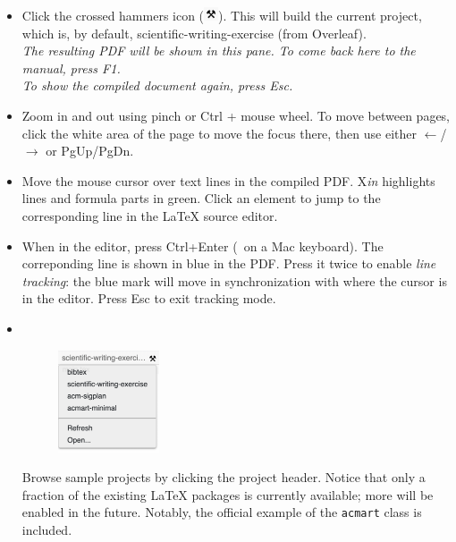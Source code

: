\documentclass{article}
\newcommand\ToXin{\raisebox{0.5pt}{T}\hspace{-.8pt}\raisebox{1pt}{o}\hspace{-1pt}X{\hspace{-1pt}\itshape in}}
\newcommand\keyplus{\raisebox{.7pt}{\fontsize{8}{8}\selectfont+}}
\newcommand\myreturn{\fontsize{9}{9}\selectfont\return}
\begin{document}
\begin{itemize}
\item Click the crossed hammers icon
 (\includegraphics[width=12pt,valign=t]{gfx/button-build.png}).
 This will build the current project,
 which is, by default, \textsf{scientific-writing-exercise} (from Overleaf). \\[.2em]
 \textit{The resulting PDF will be shown in this pane. To come back here to the manual, press {\rm F1}.}\\[.2em]
 \textit{To show the compiled document again, press {\rm Esc}.}

 
\item Zoom in and out using pinch or Ctrl + mouse wheel.
To move between pages, click the white area of the page to move the focus there,
then use either $\leftarrow$/$\rightarrow$
or PgUp/PgDn.
 
\item Move the mouse cursor over text lines in the compiled PDF.
{\ToXin} highlights lines and formula parts in green.
Click an element to jump to the corresponding line in the {\LaTeX} source editor.

\item When in the editor, press Ctrl+Enter ({\cmd\keyplus\myreturn\,} on a Mac keyboard).
The correponding line is shown in blue in the PDF.
Press it twice to enable \emph{line tracking}: the blue mark will move in synchronization with where the cursor is in the editor.
Press Esc to exit tracking mode.

\item 
\begin{minipage}[t]{4in}
~
\begin{figure}
\vspace{-3.2em}
\includegraphics[width=3cm]{gfx/project-dropdown.png}
\end{figure}
\vspace{-2.4em}

Browse sample projects by clicking the project header.
Notice that only a fraction of the existing
{\LaTeX} packages is currently available;
more will be enabled in the future.
Notably, the official example of the
\texttt{acmart} class is included.
\end{minipage}


\end{itemize}
\end{document}
